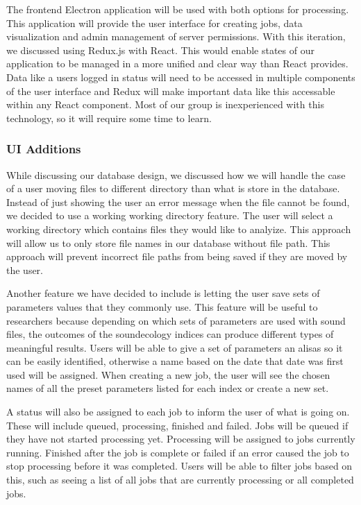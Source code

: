 The frontend Electron application will be used with both options for processing. This application will provide the user interface for creating jobs, data visualization and admin management of server permissions. With this iteration, we discussed using Redux.js with React. This would enable states of our application to be managed in a more unified and clear way than React provides. Data like a user\textquotesingle s logged in status will need to be accessed in multiple components of the user interface and Redux will make important data like this accessable within any React component. Most of our group is inexperienced with this technology, so it will require some time to learn.\par

\subsubsection{UI Additions}
While discussing our database design, we discussed how we will handle the case of a user moving files to different directory than what is store in the database. Instead of just showing the user an error message when the file cannot be found, we decided to use a working working directory feature. The user will select a working directory which contains files they would like to analyize. This approach will allow us to only store file names in our database without file path. This approach will prevent incorrect file paths from being saved if they are moved by the user.\par
Another feature we have decided to include is letting the user save sets of parameters values that they commonly use. This feature will be useful to researchers because depending on which sets of parameters are used with sound files, the outcomes of the soundecology indices can produce different types of meaningful results. Users will be able to give a set of parameters an alisas so it can be easily identified, otherwise a name based on the date that date was first used will be assigned. When creating a new job, the user will see the chosen names of all the preset parameters listed for each index or create a new set.\par
A status will also be assigned to each job to inform the user of what is going on. These will include queued, processing, finished and failed. Jobs will be queued if they have not started processing yet. Processing will be assigned to jobs currently running. Finished after the job is complete or failed if an error caused the job to stop processing before it was completed. Users will be able to filter jobs based on this, such as seeing a list of all jobs that are currently processing or all completed jobs.\par


